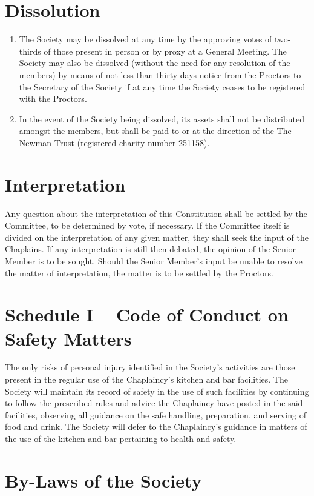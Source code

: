 \documentclass[11pt]{article}
\begin{document}
\section{Dissolution}
\begin{enumerate}
\item The Society may be dissolved at any time by the approving votes of two-thirds of those present in person or by proxy at a General Meeting. The Society may also be dissolved (without the need for any resolution of the members) by means of not less than thirty days notice from the Proctors to the Secretary of the Society if at any time the Society ceases to be registered with the Proctors.
\item In the event of the Society being dissolved, its assets shall not be distributed amongst the members, but shall be paid to or at the direction of the The Newman Trust (registered charity number 251158).
\end{enumerate}
\section{Interpretation}
Any question about the interpretation of this Constitution shall be settled by the Committee, to be determined by vote, if necessary. If the Committee itself is divided on the interpretation of any given matter, they shall seek the input of the Chaplains. If any interpretation is still then debated, the opinion of the Senior Member is to be sought. Should the Senior Member's input be unable to resolve the matter of interpretation, the matter is to be settled by the Proctors.
\section{Schedule I -- Code of Conduct on Safety Matters}
The only risks of personal injury identified in the Society's activities are those present in the regular use of the Chaplaincy's kitchen and bar facilities. The Society will maintain its record of safety in the use of such facilities by continuing to follow the prescribed rules and advice the Chaplaincy have posted in the said facilities, observing all guidance on the safe handling, preparation, and serving of food and drink. The Society will defer to the Chaplaincy's guidance in matters of the use of the kitchen and bar pertaining to health and safety.
\section{By-Laws of the Society}
\end{document}
